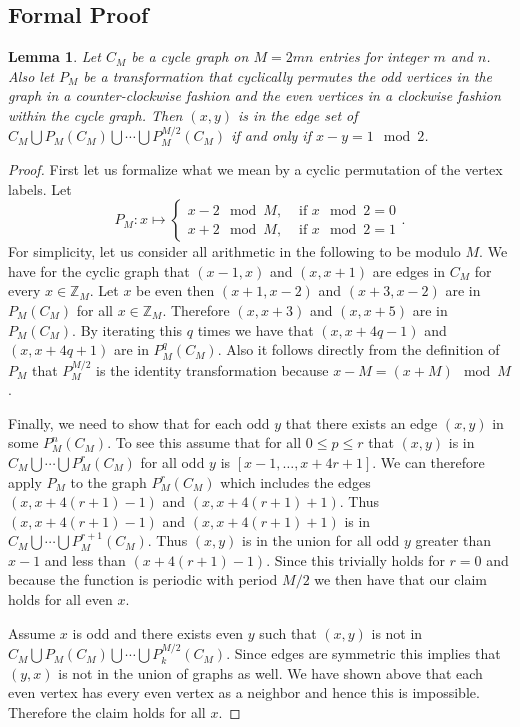 \documentclass[superscriptaddress,aps,pra,nofootinbib,notitlepage,10pt,longbibliography]{revtex4-1}
\newtheorem{lemma}[theorem]{Lemma}
\begin{document}
\subsection{Formal Proof}
\begin{lemma}\label{lem:graphcycle}
Let $C_{M}$ be a cycle graph on $M=2mn$ entries for integer $m$ and $n$.  Also  let $P_M$ be a transformation that cyclically permutes the odd vertices in the graph in a counter-clockwise fashion and the even vertices in a clockwise fashion within the cycle graph. Then $(x,y)$ is in the edge set of $C_{M}\bigcup P_{M}(C_{M})\bigcup\cdots \bigcup P_{M}^{{M/2}}(C_{M})$ if and only if $x-y = 1 \mod 2$. 
\end{lemma}
\begin{proof}
First let us formalize what we mean by a cyclic permutation of the vertex labels.  Let 
$$P_{M}: x\mapsto \begin{cases} x-2 \mod M,& \mbox{ if }x \!\!\mod 2 = 0\\ x+2 \mod M,& \mbox{ if } x\!\! \mod 2 =1\end{cases}.$$
For simplicity, let us consider all arithmetic in the following to be modulo $M$.  We have for the cyclic graph that $(x-1,x)$ and $(x,x+1)$ are edges in $C_M$ for every $x\in \mathbb{Z}_{M}$.  Let $x$ be even then $(x+1,x-2)$ and $(x+3,x-2)$ are in $P_M(C_M)$ for all $x\in \mathbb{Z}_{M}$.  Therefore $(x,x+3)$ and $(x,x+5)$ are in $P_M(C_M)$.  By iterating this $q$ times we have that $(x,x+4q-1)$ and $(x,x+4q+1)$ are in $P^q_M(C_M)$.  Also it follows directly from the definition of $P_M$ that $P_M^{M/2}$ is the identity transformation because $x-M = (x+M) \mod M$.

Finally, we need to show that for each odd $y$ that there exists an edge $(x,y)$ in some $P_M^n(C_M)$.  To see this assume that for all $0\le p\le r$ that $(x,y)$ is in $C_M \bigcup \cdots\bigcup P_M^{r}(C_M)$ for all odd $y$ is $[x-1,\ldots,x+4r+1]$.   We can therefore apply $P_M$ to the graph $P_M^r (C_M)$ which includes the edges $(x,x+4(r+1)-1)$ and $(x,x+4(r+1)+1)$.   Thus $(x,x+4(r+1)-1)$ and $(x,x+4(r+1)+1)$ is  in $C_M \bigcup \cdots\bigcup P_M^{r+1}(C_M)$.  Thus $(x,y)$ is in the union for all odd $y$ greater than $x-1$ and less than $(x+4(r+1)-1)$.  Since this trivially holds  for $r=0$ and because the function is periodic with period $M/2$ we then have that our claim holds for all even $x$.

Assume $x$ is odd and there exists even $y$ such that $(x,y)$ is not in $C_M\bigcup P_M(C_M)\bigcup\cdots \bigcup P_k^{M/2}(C_M)$.  Since edges are symmetric this implies that $(y,x)$ is not in the union of graphs as well.  We have shown above that each even vertex has every even vertex as a neighbor and hence this is impossible.  Therefore the claim holds for all $x$.
\end{proof}
\end{document}
